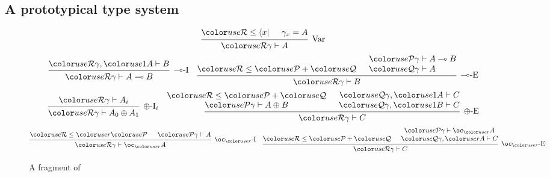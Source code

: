 \subsection{A prototypical type system}

\begin{figure}
  \begin{align*}
    \begin{prooftree}
      \hypo{\grR \leq \bra x}
      \hypo{\gamma_x = A}
      \infer2[Var]{\grR\gamma \vdash A}
    \end{prooftree}
  \end{align*}
  \begin{align*}
    \begin{prooftree}
      \hypo{\grR\gamma, \gr1A \vdash B}
      \infer1[$\multimap$-I]{\grR\gamma \vdash A \multimap B}
    \end{prooftree}
    &&
    \begin{prooftree}
      \hypo{\grR \leq \grP + \grQ}
      \hypo{\grP\gamma &\vdash A \multimap B}
      \infer[no rule]1{\grQ\gamma &\vdash A \phantom{{} \multimap B}}
      \infer2[$\multimap$-E]{\grR\gamma \vdash B}
    \end{prooftree}
  \end{align*}
  \begin{align*}
    \begin{prooftree}
      \hypo{\grR\gamma \vdash A_i}
      \infer1[$\oplus$-I$_i$]{\grR\gamma \vdash A_0 \oplus A_1}
    \end{prooftree}
    &&
    \begin{prooftree}
      \hypo{\grR \leq \grP + \grQ}
      \infer[no rule]1{\grP\gamma \vdash A \oplus B}
      \hypo{\grQ\gamma, \gr1A &\vdash C}
      \infer[no rule]1{\grQ\gamma, \gr1B &\vdash C}
      \infer2[$\oplus$-E]{\grR\gamma \vdash C}
    \end{prooftree}
  \end{align*}
  \begin{align*}
    \begin{prooftree}
      \hypo{\grR \leq \gr r\grP}
      \hypo{\grP\gamma \vdash A}
      \infer2[$\oc_{\gr r}$-I]{\grR\gamma \vdash \oc_{\gr r} A}
    \end{prooftree}
    &&
    \begin{prooftree}
      \hypo{\grR \leq \grP + \grQ}
      \hypo{\grP\gamma \vdash \oc_{\gr r} A}
      \infer[no rule]1{\grQ\gamma, \gr rA \vdash C}
      \infer2[$\oc_{\gr r}$-E]{\grR\gamma \vdash C}
    \end{prooftree}
  \end{align*}
  \caption{A fragment of \name{}}\label{fig:lr}
\end{figure}

